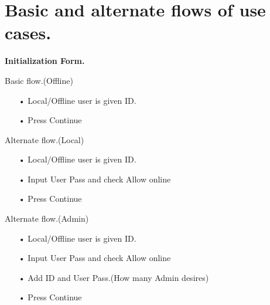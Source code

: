 \section{Basic and alternate flows of use cases.}
\begin{flushleft}
\textbf{Initialization Form.}\par
Basic flow.(Offline)\par
\begin{enumerate}
		\item[•] Local/Offline user is given ID.
    	\item[•] Press Continue
\end{enumerate}
Alternate flow.(Local)\par
\begin{enumerate}
		\item[•] Local/Offline user is given ID.
    	\item[•] Input User Pass and check Allow online
    	\item[•] Press Continue
\end{enumerate}
Alternate flow.(Admin)\par
\begin{enumerate}
		\item[•] Local/Offline user is given ID.
    	\item[•] Input User Pass and check Allow online
    	\item[•] Add ID and User Pass.(How many Admin desires)
    	\item[•] Press Continue
\end{enumerate}


\end{flushleft}
